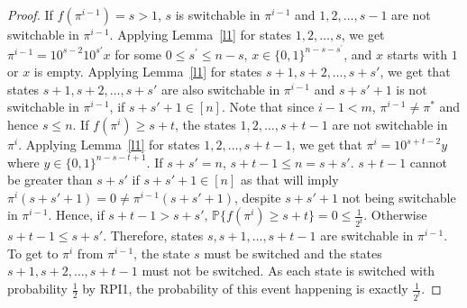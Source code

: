 \begin{appendices}
\begin{proof}
If $f(\pi^{i-1})=s>1$, $s$ is switchable in $\pi^{i-1}$ and $1,2,\dots,s-1$ are not switchable in $\pi^{i-1}$. Applying Lemma~\ref{l1} for states $1,2,\dots,s$, we get $\pi^{i-1}=10^{s-2}10^{s'}x$ for some $0 \le s^\prime \le n-s$, $x\in \{0,1\}^{n-s-s^\prime}$, and $x$ starts with $1$ or $x$ is empty. Applying Lemma~\ref{l1} for states $s+1,s+2,\dots,s+s'$, we get that states $s+1,s+2,\dots,s+s'$ are also switchable in $\pi^{i-1}$ and $s+s'+1$ is not switchable in $\pi^{i-1}$, if $s+s'+1\in [n]$. Note that since $i-1<m$, $\pi^{i-1}\ne \pi^{*}$ and hence $s\le n$. If $f(\pi^{i})\ge s+t$, the states $1,2,\dots,s+t-1$ are not switchable in $\pi^i$. Applying Lemma~\ref{l1} for states $1,2,\dots,s+t-1$, we get that $\pi^{i}=10^{s+t-2}y$ where $y\in \{0,1\}^{n-s-t+1}$. If $s+s'=n$, $s+t-1\le n=s+s'$. $s+t-1$ cannot be greater than $s+s'$ if $s+s'+1\in [n]$ as that will imply $\pi^{i}(s+s'+1)=0\ne \pi^{i-1}(s+s'+1)$, despite $s+s'+1$ not being switchable in $\pi^{i-1}$. Hence, if $s+t-1 > s+s'$, $\mathbb{P}\{f(\pi^i)\ge s+t\}=0\le \frac{1}{2^t}$. Otherwise $s+t-1 \le s+s'$. Therefore, states $s,s+1,\dots,s+t-1$ are switchable in $\pi^{i-1}$. To get to $\pi^i$ from $\pi^{i-1}$, the state $s$ must be switched and the states $s+1,s + 2, \dots,s+t-1$ must not be switched. As each state is switched with probability $\frac{1}{2}$ by RPI1, the probability of this event happening is exactly $\frac{1}{2^t}$.
\end{proof}


\end{appendices}
